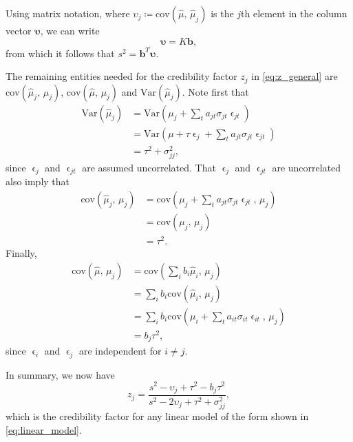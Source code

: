 \documentclass[11pt]{article}
\theoremstyle{definition}
\begin{document}
Using matrix notation, where $\upsilon_j\coloneqq\text{cov}(\hat\mu,\, \hat\mu_j)$ is the $j$th element in the column vector $\bm\upsilon$, we can write
\begin{equation*}
    \bm\upsilon =  K \bm b,
\end{equation*}
from which it follows that $s^2 = \bm b^T \bm \upsilon$.

The remaining entities needed for the credibility factor $z_j$ in \eqref{eq:z_general} are $\text{cov}(\hat\mu_j,\, \mu_j)$, $\text{cov}(\hat\mu,\, \mu_j)$ and $\text{Var}(\hat\mu_j)$. Note first that 
\begin{equation*}
    \begin{aligned}
        \text{Var}(\hat\mu_j) &= \text{Var}(\mu_j + \sum_t a_{jt}\sigma_{jt}\upvarepsilon_{jt}) \\
        &= \text{Var}(\mu + \tau\upvarepsilon_j + \sum_t a_{jt}\sigma_{jt}\upvarepsilon_{jt}) \\
        &= \tau^2 + \sigma_{jj}^2,
    \end{aligned}
\end{equation*}
since $\upvarepsilon_j$ and $\upvarepsilon_{jt}$ are assumed uncorrelated. That $\upvarepsilon_j$ and $\upvarepsilon_{jt}$ are uncorrelated also imply that
\begin{equation*}
    \begin{aligned}
        \text{cov}(\hat\mu_j,\, \mu_j) &= \text{cov}(\mu_j + \sum_t a_{jt}\sigma_{jt}\upvarepsilon_{jt},\, \mu_j) \\
        &= \text{cov}(\mu_j,\, \mu_j) \\
        &= \tau^2.
    \end{aligned}
\end{equation*}
Finally,
\begin{equation*}
    \begin{aligned}
        \text{cov}(\hat\mu,\, \mu_j) &= \text{cov}(\sum_i b_i \hat\mu_i,\, \mu_j) \\
        &= \sum_i b_i \text{cov}(\hat\mu_i,\, \mu_j) \\
        &= \sum_i b_i \text{cov}(\mu_i + \sum_t a_{it}\sigma_{it}\upvarepsilon_{it},\, \mu_j) \\
        &= b_j \tau^2,
    \end{aligned}
\end{equation*}
since $\upvarepsilon_i$ and $\upvarepsilon_j$ are independent for $i\neq j$.

In summary, we now have
\begin{equation}\label{eq:linear_z}
    z_j = \frac{s^2 - \upsilon_j + \tau^2 - b_j \tau^2}{s^2 - 2\upsilon_j + \tau^2 + \sigma_{jj}^2},
\end{equation}
which is the credibility factor for any linear model of the form shown in \eqref{eq:linear_model}.
\end{document}
